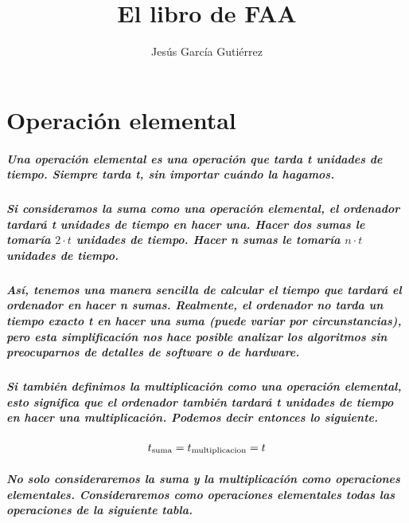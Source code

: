 \documentclass{book}
\title{El libro de FAA}
\date{}
\author{Jesús García Gutiérrez}
\begin{document}
	\maketitle{}
	\chapter{Operación elemental}
	\paragraph{Una operación elemental es una operación que tarda \textit{t} unidades de tiempo. Siempre tarda \textit{t}, sin importar cuándo la hagamos.}
	\paragraph{Si consideramos la suma como una operación elemental, el ordenador tardará \textit{t} unidades de tiempo en hacer una. Hacer dos sumas le tomaría $2 \cdot t$ unidades de tiempo. Hacer n sumas le tomaría $n \cdot t$ unidades de tiempo.}	
	\paragraph{Así,  tenemos una manera sencilla de calcular el tiempo que tardará el ordenador en hacer \textit{n} sumas. Realmente, el ordenador no tarda un tiempo exacto \textit{t} en hacer una suma (puede variar por circunstancias), pero esta simplificación nos hace posible analizar los algoritmos sin preocuparnos de detalles de software o de hardware.}
	\paragraph{Si también definimos la multiplicación como una operación elemental, esto significa que el ordenador también tardará \textit{t} unidades de tiempo en hacer una multiplicación. Podemos decir entonces lo siguiente.}
      \begin{equation}
	      t\textsubscript{suma} = t\textsubscript{multiplicacion} = t
      \end{equation}	
      \paragraph{No solo consideraremos la suma y la multiplicación como operaciones elementales. Consideraremos como operaciones elementales todas las operaciones de la siguiente tabla.}
      \paragraph{}
\end{document}
